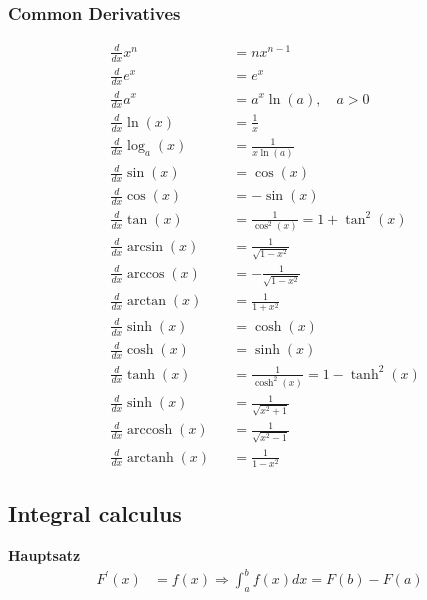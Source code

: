\subsubsection{Common Derivatives}
\begin{align*}
     & \frac{d}{dx}x^n                       &  & =nx^{n-1}                              \\
     & \frac{d}{dx}e^x                       &  & =e^x                                   \\
     & \frac{d}{dx}a^x                       &  & =a^x\ln(a),\quad a>0                   \\
     & \frac{d}{dx}\ln(x)                    &  & =\frac1x                               \\
     & \frac{d}{dx}\log_a(x)                 &  & =\frac1{x\ln(a)}                       \\
     & \frac{d}{dx}\sin(x)                   &  & =\cos(x)                               \\
     & \frac{d}{dx}\cos(x)                   &  & =-\sin(x)                              \\
     & \frac{d}{dx}\tan(x)                   &  & =\frac1{\cos^2(x)}=1+\tan^2(x)         \\
     & \frac{d}{dx}\arcsin(x)                &  & =\frac1{\sqrt{1-x^2}}                  \\
     & \frac{d}{dx}\arccos(x)                &  & =-\frac1{\sqrt{1-x^2}}                 \\
     & \frac{d}{dx}\arctan(x)                &  & =\frac1{1+x^2}                         \\
     & \frac{d}{dx}\sinh(x)                  &  & =\cosh(x)                              \\
     & \frac{d}{dx}\cosh(x)                  &  & =\sinh(x)                              \\
     & \frac{d}{dx}\tanh(x)                  &  & =\frac{1}{\cosh^{2}(x)}=1-\tanh^{2}(x) \\
     & \frac{d}{dx}\sinh(x)                  &  & =\frac1{\sqrt{x^2+1}}                  \\
     & \frac{d}{dx}\operatorname{arccosh}(x) &  & =\frac1{\sqrt{x^2-1}}                  \\
     & \frac{d}{dx}\operatorname{arctanh}(x) &  & =\frac1{1-x^2}
\end{align*}

\subsection{Integral calculus}
\textbf{Hauptsatz}
\begin{align*}
    F^{\prime}(x) & =f(x)\Longrightarrow\int_a^b f(x)dx=F(b)-F(a)
\end{align*}

